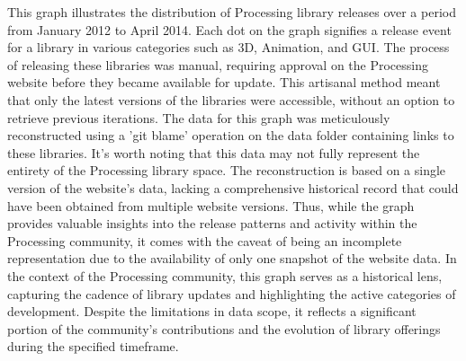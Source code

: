 \begin{multicols}{3}
	\noindent
	This graph illustrates the distribution of Processing library releases over a period from January 2012 to April 2014. Each dot on the graph signifies a release event for a library in various categories such as 3D, Animation, and GUI. The process of releasing these libraries was manual, requiring approval on the Processing website before they became available for update. This artisanal method meant that only the latest versions of the libraries were accessible, without an option to retrieve previous iterations.
	\noindent
	The data for this graph was meticulously reconstructed using a 'git blame' operation on the data folder containing links to these libraries. It's worth noting that this data may not fully represent the entirety of the Processing library space. The reconstruction is based on a single version of the website's data, lacking a comprehensive historical record that could have been obtained from multiple website versions. Thus, while the graph provides valuable insights into the release patterns and activity within the Processing community, it comes with the caveat of being an incomplete representation due to the availability of only one snapshot of the website data.
	\noindent
	In the context of the Processing community, this graph serves as a historical lens, capturing the cadence of library updates and highlighting the active categories of development. Despite the limitations in data scope, it reflects a significant portion of the community's contributions and the evolution of library offerings during the specified timeframe.
\end{multicols}
